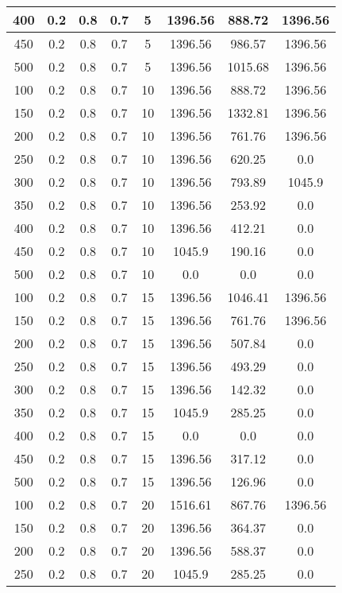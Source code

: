 \documentclass[a4paper, 12pt]{extreport}
\begin{document}
\begin{itemize}
\begin{longtable}{|c|c|c|c|c|c|c|c|}
			400 & 0.2 & 0.8 & 0.7 & 5 & 1396.56 & 888.72 & 1396.56 \\\hline
			450 & 0.2 & 0.8 & 0.7 & 5 & 1396.56 & 986.57 & 1396.56 \\\hline
			500 & 0.2 & 0.8 & 0.7 & 5 & 1396.56 & 1015.68 & 1396.56 \\\hline
			100 & 0.2 & 0.8 & 0.7 & 10 & 1396.56 & 888.72 & 1396.56 \\\hline
			150 & 0.2 & 0.8 & 0.7 & 10 & 1396.56 & 1332.81 & 1396.56 \\\hline
			200 & 0.2 & 0.8 & 0.7 & 10 & 1396.56 & 761.76 & 1396.56 \\\hline
			250 & 0.2 & 0.8 & 0.7 & 10 & 1396.56 & 620.25 & 0.0 \\\hline
			300 & 0.2 & 0.8 & 0.7 & 10 & 1396.56 & 793.89 & 1045.9 \\\hline
			350 & 0.2 & 0.8 & 0.7 & 10 & 1396.56 & 253.92 & 0.0 \\\hline
			400 & 0.2 & 0.8 & 0.7 & 10 & 1396.56 & 412.21 & 0.0 \\\hline
			450 & 0.2 & 0.8 & 0.7 & 10 & 1045.9 & 190.16 & 0.0 \\\hline
			500 & 0.2 & 0.8 & 0.7 & 10 & 0.0 & 0.0 & 0.0 \\\hline
			100 & 0.2 & 0.8 & 0.7 & 15 & 1396.56 & 1046.41 & 1396.56 \\\hline
			150 & 0.2 & 0.8 & 0.7 & 15 & 1396.56 & 761.76 & 1396.56 \\\hline
			200 & 0.2 & 0.8 & 0.7 & 15 & 1396.56 & 507.84 & 0.0 \\\hline
			250 & 0.2 & 0.8 & 0.7 & 15 & 1396.56 & 493.29 & 0.0 \\\hline
			300 & 0.2 & 0.8 & 0.7 & 15 & 1396.56 & 142.32 & 0.0 \\\hline
			350 & 0.2 & 0.8 & 0.7 & 15 & 1045.9 & 285.25 & 0.0 \\\hline
			400 & 0.2 & 0.8 & 0.7 & 15 & 0.0 & 0.0 & 0.0 \\\hline
			450 & 0.2 & 0.8 & 0.7 & 15 & 1396.56 & 317.12 & 0.0 \\\hline
			500 & 0.2 & 0.8 & 0.7 & 15 & 1396.56 & 126.96 & 0.0 \\\hline
			100 & 0.2 & 0.8 & 0.7 & 20 & 1516.61 & 867.76 & 1396.56 \\\hline
			150 & 0.2 & 0.8 & 0.7 & 20 & 1396.56 & 364.37 & 0.0 \\\hline
			200 & 0.2 & 0.8 & 0.7 & 20 & 1396.56 & 588.37 & 0.0 \\\hline
			250 & 0.2 & 0.8 & 0.7 & 20 & 1045.9 & 285.25 & 0.0 \\\hline

\end{longtable}
\end{itemize}
\end{document}
